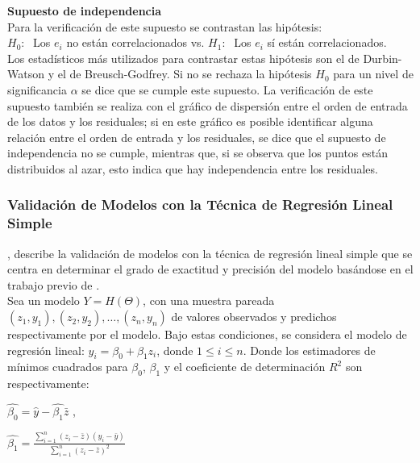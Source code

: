 \textbf{Supuesto de independencia}\\

Para la verificación de este supuesto se contrastan las hipótesis:\\

$H_0:\;$ Los $e_i$ no están correlacionados vs. $H_1:\;$ Los $e_i$ sí están correlacionados.\\

Los estadísticos más utilizados para contrastar estas hipótesis son el de Durbin-Watson y el de Breusch-Godfrey. Si no se rechaza la hipótesis $H_0$ para un nivel de significancia $\alpha$ se dice que se cumple este supuesto. La verificación de este supuesto también se realiza con el gráfico de dispersión entre el orden de entrada de los datos y los residuales; si en este gráfico es posible identificar alguna relación entre el orden de entrada y los residuales, se dice que el supuesto de independencia no se cumple, mientras que, si se observa que los puntos están distribuidos al azar, esto indica que hay independencia entre los residuales.


\subsubsection{Validación de Modelos con la Técnica de Regresión Lineal Simple \parencite{febles-2014}}

\textcite{febles-2014}, describe la validación de modelos con la técnica de regresión lineal simple que se centra en determinar el grado de exactitud y precisión del modelo basándose en el trabajo previo de \textcite{balam-2012}.\\

Sea un modelo $Y = H(\Theta )$, con una muestra pareada $(z_{1}, y_{1}), (z_{2}, y_{2}) , \dots , (z_{n}, y_{n})$ de valores observados y predichos respectivamente por el modelo. Bajo estas condiciones, se considera el modelo de regresión lineal: $y_{i}= \beta_{0} + \beta_{1}z_{i}$, donde $ 1 \leq i \leq n$. Donde  los estimadores de mínimos cuadrados para $\beta_{0}$,  $\beta_{1}$ y el coeficiente de determinación $R^{2}$ son respectivamente: \\

\begin{center}
{\large$\hat{\beta_{0}} = \hat{y} - \hat{\beta_{1}} \bar{z}$} ,\\
\end{center}

\begin{center}
{\Large$ \hat{\beta_{1}} = \frac{\sum_{i=1}^{n} (z_{i} - \bar{z} ) (y_{i} - \bar{y})} {  \sum_{i=1}^{n} (z_{i} - \bar{z} )^{2} }$} \\
\end{center}

